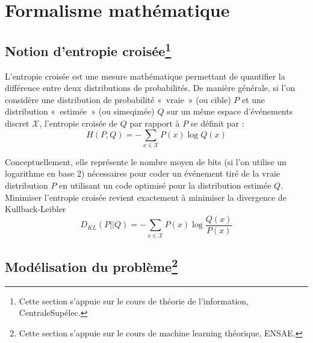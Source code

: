 \documentclass[a4paper,11pt]{paper}
\theoremstyle{plain}
\theoremstyle{definition}
\theoremstyle{remark}
\begin{document}
\newpage


\section{Formalisme mathématique}


\subsection{Notion d'entropie croisée\texorpdfstring{\protect\footnote{Cette section s'appuie sur le cours de théorie de l'information, CentraleSupélec.}}{}}

L'entropie croisée est une mesure mathématique permettant de quantifier la différence entre deux distributions de probabilités. De manière générale, si l'on considère une distribution de probabilité «~vraie~» (ou cible) $P$ et une distribution «~estimée~» (ou simeqimée) $Q$ sur un même espace d'événements discret $\mathcal{X}$, l'entropie croisée de $Q$ par rapport à $P$ se définit par :
$$H(P, Q) = - \sum_{x \in \mathcal{X}} P(x) \log Q(x)$$

Conceptuellement, elle représente le nombre moyen de bits (si l'on utilise un logarithme en base 2) nécessaires pour coder un événement tiré de la vraie distribution $P$ en utilisant un code optimisé pour la distribution estimée $Q$. Minimiser l'entropie croisée revient exactement à minimiser la divergence de Kullback-Leibler
$$D_{KL}(P || Q) = -\sum_{x \in \mathcal X} P(x) \log \dfrac{Q(x)}{P(x)}$$


\subsection{Modélisation du problème\texorpdfstring{\protect\footnote{Cette section s'appuie sur le cours de machine learning théorique, ENSAE.}}{}}
\end{document}
